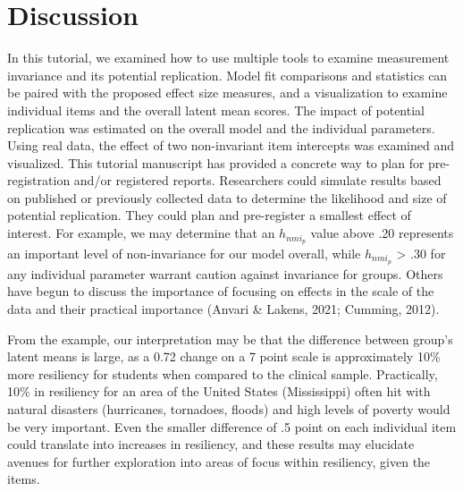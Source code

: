 \documentclass[
  man]{apa7}
\begin{document}
\hypertarget{discussion}{%
\section{Discussion}\label{discussion}}

In this tutorial, we examined how to use multiple tools to examine measurement invariance and its potential replication. Model fit comparisons and statistics can be paired with the proposed effect size measures, and a visualization to examine individual items and the overall latent mean scores. The impact of potential replication was estimated on the overall model and the individual parameters. Using real data, the effect of two non-invariant item intercepts was examined and visualized. This tutorial manuscript has provided a concrete way to plan for pre-registration and/or registered reports. Researchers could simulate results based on published or previously collected data to determine the likelihood and size of potential replication. They could plan and pre-register a smallest effect of interest. For example, we may determine that an \(h_{nmi_p}\) value above .20 represents an important level of non-invariance for our model overall, while \(h_{nmi_p}\) \textgreater{} .30 for any individual parameter warrant caution against invariance for groups. Others have begun to discuss the importance of focusing on effects in the scale of the data and their practical importance (Anvari \& Lakens, 2021; Cumming, 2012).

From the example, our interpretation may be that the difference between group's latent means is large, as a 0.72 change on a 7 point scale is approximately 10\% more resiliency for students when compared to the clinical sample. Practically, 10\% in resiliency for an area of the United States (Mississippi) often hit with natural disasters (hurricanes, tornadoes, floods) and high levels of poverty would be very important. Even the smaller difference of .5 point on each individual item could translate into increases in resiliency, and these results may elucidate avenues for further exploration into areas of focus within resiliency, given the items.
\end{document}
